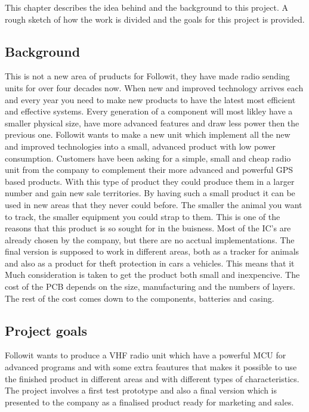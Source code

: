 This chapter describes the idea behind and the background to this project. A rough sketch of how the work is divided and the goals for this project is provided.

\subsection{Background}
This is not a new area of pruducts for Followit, they have made radio sending units for over four decades now.
When new and improved technology arrives each and every year you need to make new products to have the latest most efficient and effective systems. Every generation of a component will most likley have a smaller physical size, have more advanced features and draw less power then the previous one. Followit wants to make a new unit which implement all the new and improved technologies into a small, advanced product with low power consumption. 
Customers have been asking for a simple, small and cheap radio unit from the company to complement their more advanced and powerful GPS based products. With this type of product they could produce them in a larger number and gain new sale territories. By having such a small product it can be used in new areas that they never could before. The smaller the animal you want to track, the smaller equipment you could strap to them. This is one of the reasons that this product is so sought for in the buisness. Most of the \gls{IC}'s are already chosen by the company, but there are no acctual implementations. The final version is supposed to work in different areas, both as a tracker for animals and also as a product for theft protection in cars a vehicles. This means that it  Much consideration is taken to get the product both small and inexpencive. The cost of the PCB depends on the size, manufacturing and the numbers of layers. The rest of the cost comes down to the components, batteries and casing.    \\

\subsection{Project goals}
Followit wants to produce a VHF radio unit which have a powerful MCU for advanced programs and with some extra feautures that makes it possible to use the finished product in different areas and with different types of characteristics. The project involves a first test prototype and also a final version which is presented to the company as a finalised product ready for marketing and sales. 

